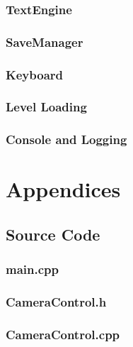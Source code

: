 \documentclass{article}
\begin{document}
\subsubsection{TextEngine}

\subsubsection{SaveManager}

\subsubsection{Keyboard}

\subsubsection{Level Loading}

\subsubsection{Console and Logging}

\section{Appendices}

\subsection{Source Code}

\subsubsection{main.cpp}
	
 				
\subsubsection{CameraControl.h}
	

\subsubsection{CameraControl.cpp}
	
					
\end{document}
